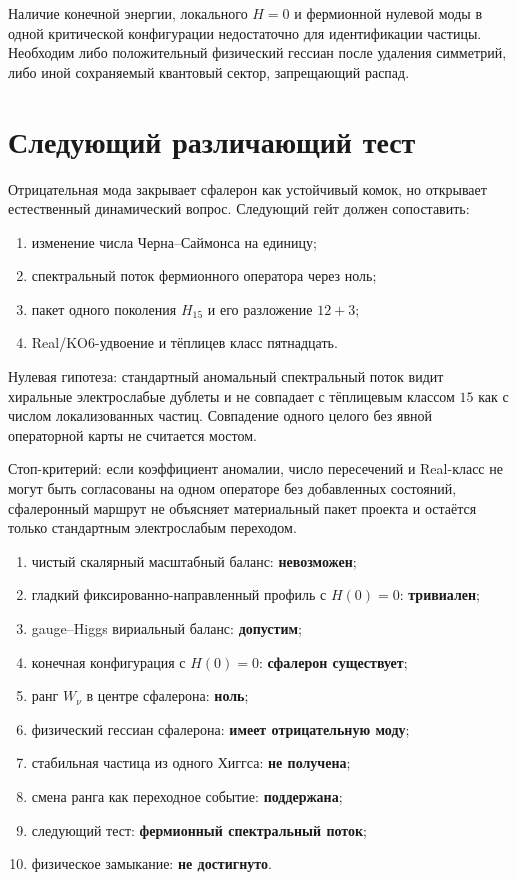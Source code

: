 \begin{nogocriterion}
Наличие конечной энергии, локального $H=0$ и фермионной нулевой моды в
одной критической конфигурации недостаточно для идентификации частицы.
Необходим либо положительный физический гессиан после удаления симметрий,
либо иной сохраняемый квантовый сектор, запрещающий распад.
\end{nogocriterion}

\section{Следующий различающий тест}

Отрицательная мода закрывает сфалерон как устойчивый комок, но открывает
естественный динамический вопрос. Следующий гейт
должен сопоставить:
\begin{enumerate}
 \item изменение числа Черна--Саймонса на единицу;
 \item спектральный поток фермионного оператора через ноль;
 \item пакет одного поколения $H_{15}$ и его разложение $12+3$;
 \item Real/KO6-удвоение и тёплицев класс пятнадцать.
\end{enumerate}

Нулевая гипотеза: стандартный аномальный спектральный поток видит
хиральные электрослабые дублеты и не совпадает с тёплицевым классом
$15$ как с числом локализованных частиц. Совпадение одного целого без
явной операторной карты не считается мостом.

Стоп-критерий: если коэффициент аномалии, число пересечений и Real-класс
не могут быть согласованы на одном операторе без добавленных состояний,
сфалеронный маршрут не объясняет материальный пакет проекта и остаётся
только стандартным электрослабым переходом.

\begin{protocol}
\begin{enumerate}
 \item чистый скалярный масштабный баланс: \textbf{невозможен};
 \item гладкий фиксированно-направленный профиль с $H(0)=0$:
 \textbf{тривиален};
 \item gauge--Higgs вириальный баланс: \textbf{допустим};
 \item конечная конфигурация с $H(0)=0$: \textbf{сфалерон существует};
 \item ранг $W_\nu$ в центре сфалерона: \textbf{ноль};
 \item физический гессиан сфалерона: \textbf{имеет отрицательную моду};
 \item стабильная частица из одного Хиггса: \textbf{не получена};
 \item смена ранга как переходное событие: \textbf{поддержана};
 \item следующий тест: \textbf{фермионный спектральный поток};
 \item физическое замыкание: \textbf{не достигнуто}.
\end{enumerate}
\end{protocol}


